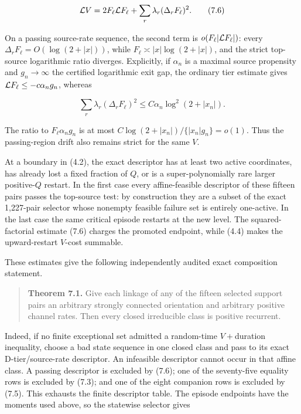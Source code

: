 \[
 {\cal L}V=2F_\ell{\cal L}F_\ell+
 \sum_r\lambda_r(\Delta_rF_\ell)^2.                  \tag{7.6}
\]

On a passing source-rate sequence, the second term is
\(o(F_\ell|{\cal L}F_\ell|)\): every \(\Delta_rF_\ell=O(\log(2+|x|))\),
while \(F_\ell\asymp |x|\log(2+|x|)\), and the strict top-source
logarithmic ratio diverges. Explicitly, if \(\alpha_n\) is a maximal
source propensity and \(g_n\to\infty\) the certified logarithmic exit
gap, the ordinary tier estimate gives
\({\cal L}F_\ell\le-c\alpha_ng_n\), whereas

\[
 \sum_r\lambda_r(\Delta_rF_\ell)^2
 \le C\alpha_n\log^2(2+|x_n|).
\]

The ratio to \(F_\ell\alpha_ng_n\) is at most
\(C\log(2+|x_n|)/\{|x_n|g_n\}=o(1)\). Thus the passing-region drift also
remains strict for the same \(V\).

At a boundary in (4.2), the exact descriptor has at least two active
coordinates, has already lost a fixed fraction of \(Q\), or is a
super-polynomially rare larger positive-\(Q\) restart. In the first case
every affine-feasible descriptor of these fifteen pairs passes the
top-source test: by construction they are a subset of the exact
1,227-pair selector whose nonempty feasible failure set is entirely
one-active. In the last case the same critical episode restarts at the
new level. The squared-factorial estimate (7.6) charges the promoted
endpoint, while (4.4) makes the upward-restart \(V\)-cost summable.

These estimates give the following independently audited exact
composition statement.

\begin{quote}
\textbf{Theorem 7.1.} Give each linkage of any of the fifteen selected
support pairs an arbitrary strongly connected orientation and arbitrary
positive channel rates. Then every closed irreducible class is positive
recurrent.
\end{quote}

Indeed, if no finite exceptional set admitted a random-time
\(V+\)duration inequality, choose a bad state sequence in one closed
class and pass to its exact D-tier/source-rate descriptor. An infeasible
descriptor cannot occur in that affine class. A passing descriptor is
excluded by (7.6); one of the seventy-five equality rows is excluded by
(7.3); and one of the eight companion rows is excluded by (7.5). This
exhausts the finite descriptor table. The episode endpoints have the
moments used above, so the statewise selector gives

